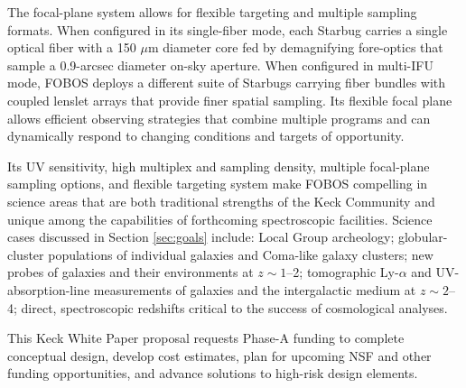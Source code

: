 The focal-plane system allows for flexible targeting
and multiple sampling formats. When configured in its single-fiber
mode, each Starbug carries a single optical fiber with a 150 $\mu$m
diameter core fed by demagnifying fore-optics that sample a
0.9-arcsec diameter on-sky aperture. When configured in multi-IFU
mode, FOBOS deploys a different suite of Starbugs carrying fiber
bundles with coupled lenslet arrays that provide finer spatial
sampling. Its flexible focal plane allows efficient observing
strategies that combine multiple programs and can dynamically respond
to changing conditions and targets of opportunity.


Its UV sensitivity, high multiplex and sampling density, multiple
focal-plane sampling options, and flexible targeting system make
FOBOS compelling in science areas that are both traditional strengths
of the Keck Community and unique among the capabilities of
forthcoming spectroscopic facilities. Science cases discussed in
Section \ref{sec:goals} include: Local Group archeology;
globular-cluster populations of individual galaxies and Coma-like
galaxy clusters; new probes of galaxies and their environments at $z \sim 1$--2; tomographic Ly-$\alpha$ and
UV-absorption-line measurements of galaxies and the intergalactic
medium at $z \sim 2$--4; direct, spectroscopic redshifts critical to
the success of cosmological analyses.

This Keck White Paper proposal requests Phase-A funding to complete conceptual design, develop cost estimates, plan for upcoming NSF and other funding opportunities, and advance solutions to high-risk design elements.  




